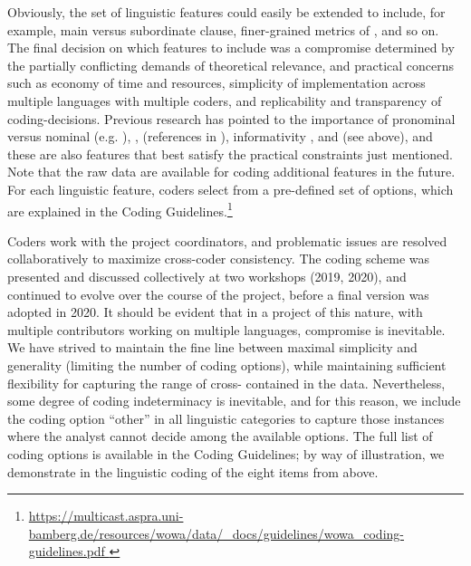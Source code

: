 \documentclass[output=paper,colorlinks,citecolor=brown,collectionchapter]{langscibook}
\begin{document}
Obviously, the set of linguistic features could easily be extended to include, for example, main versus subordinate clause, finer-grained metrics of , and so on. The final decision on which features to include was a compromise determined by the partially conflicting demands of theoretical relevance, and practical concerns such as economy of time and resources, simplicity of implementation across multiple languages with multiple coders, and replicability and transparency of coding-decisions.  Previous research has pointed to the importance of pronominal versus nominal (e.g. \citealt{gerdes_typometrics_2021}), ,  (references in ), informativity \citep{FaghiriSamvelian2020SOV},  and  (see  above), and these are also features that best satisfy the practical constraints just mentioned. Note that the raw data are available for coding additional features in the future. For each linguistic feature, coders select from a pre-defined set of options, which are explained in the Coding Guidelines.\footnote{\url{https://multicast.aspra.uni-bamberg.de/resources/wowa/data/_docs/guidelines/wowa_coding-guidelines.pdf }}

Coders work with the project coordinators, and problematic issues are resolved collaboratively to maximize cross-coder consistency. The coding scheme was presented and discussed collectively at two workshops (2019, 2020), and continued to evolve over the course of the project, before a final version was adopted in 2020. It should be evident that in a project of this nature, with multiple contributors working on multiple languages, compromise is inevitable. We have strived to maintain the fine line between maximal simplicity and generality (limiting the number of coding options), while maintaining sufficient flexibility for capturing the range of cross- contained in the data. Nevertheless, some degree of coding indeterminacy is inevitable, and for this reason, we include the coding option ``other'' in all linguistic categories to capture those instances where the analyst cannot decide among the available options. The full list of coding options is available in the Coding Guidelines; by way of illustration, we demonstrate in  the linguistic coding of the eight items from  above.
\end{document}
